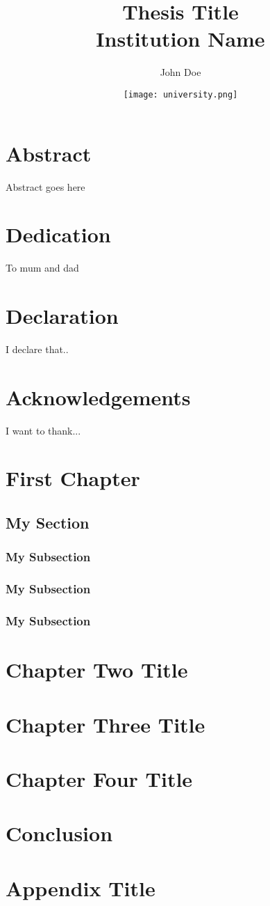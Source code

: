 \documentclass[12pt]{report}
\title{
	{\Huge{\bfseries Thesis Title}}\\
	{\large Institution Name}
}
\author{John Doe}
\date{
\vspace{1cm}
{\texttt{[image: university.png]}}
}
\begin{document}
\maketitle

\chapter*{Abstract}
Abstract goes here

\chapter*{Dedication}
To mum and dad

\chapter*{Declaration}
I declare that..

\chapter*{Acknowledgements}
I want to thank...

\tableofcontents

\chapter{First Chapter}
%
\section{My Section}
\subsection{My Subsection}

\subsection{My Subsection}

\subsection{My Subsection}





\chapter{Chapter Two Title}
%

\chapter{Chapter Three Title}
%

\chapter{Chapter Four Title}
%

\chapter{Conclusion}
%

\appendix
\chapter{Appendix Title}
%
\end{document}
